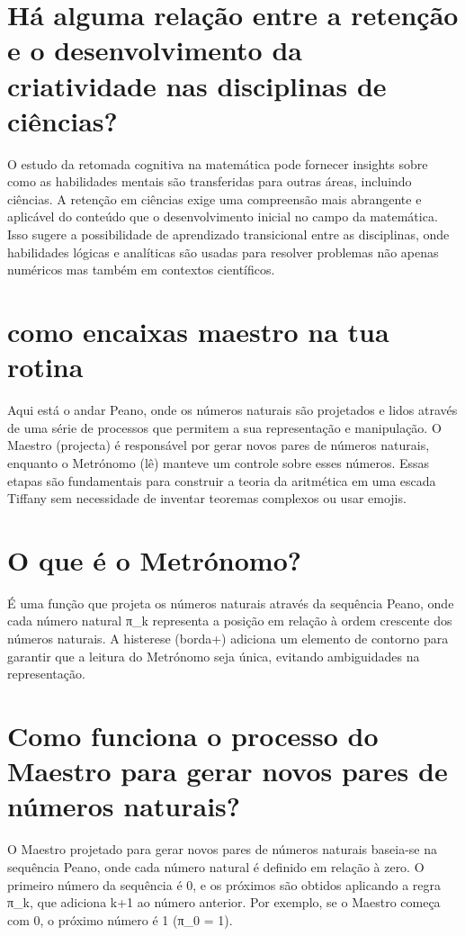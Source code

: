 \documentclass[11pt,a4paper]{article}
\begin{document}
\section{Há alguma relação entre a retenção e o desenvolvimento da criatividade nas disciplinas de ciências?}
O estudo da retomada cognitiva na matemática pode fornecer insights sobre como as habilidades mentais são transferidas para outras áreas, incluindo ciências. A retenção em ciências exige uma compreensão mais abrangente e aplicável do conteúdo que o desenvolvimento inicial no campo da matemática. Isso sugere a possibilidade de aprendizado transicional entre as disciplinas, onde habilidades lógicas e analíticas são usadas para resolver problemas não apenas numéricos mas também em contextos científicos.

\section{como encaixas maestro na tua rotina}
Aqui está o andar Peano, onde os números naturais são projetados e lidos através de uma série de processos que permitem a sua representação e manipulação. O Maestro (projecta) é responsável por gerar novos pares de números naturais, enquanto o Metrónomo (lê) manteve um controle sobre esses números. Essas etapas são fundamentais para construir a teoria da aritmética em uma escada Tiffany sem necessidade de inventar teoremas complexos ou usar emojis.

\section{O que é o Metrónomo?}
É uma função que projeta os números naturais através da sequência Peano, onde cada número natural π\_k representa a posição em relação à ordem crescente dos números naturais. A histerese (borda+) adiciona um elemento de contorno para garantir que a leitura do Metrónomo seja única, evitando ambiguidades na representação.

\section{Como funciona o processo do Maestro para gerar novos pares de números naturais?}
O Maestro projetado para gerar novos pares de números naturais baseia-se na sequência Peano, onde cada número natural é definido em relação à zero. O primeiro número da sequência é 0, e os próximos são obtidos aplicando a regra π\_k, que adiciona k+1 ao número anterior. Por exemplo, se o Maestro começa com 0, o próximo número é 1 (π\_0 = 1).
\end{document}
